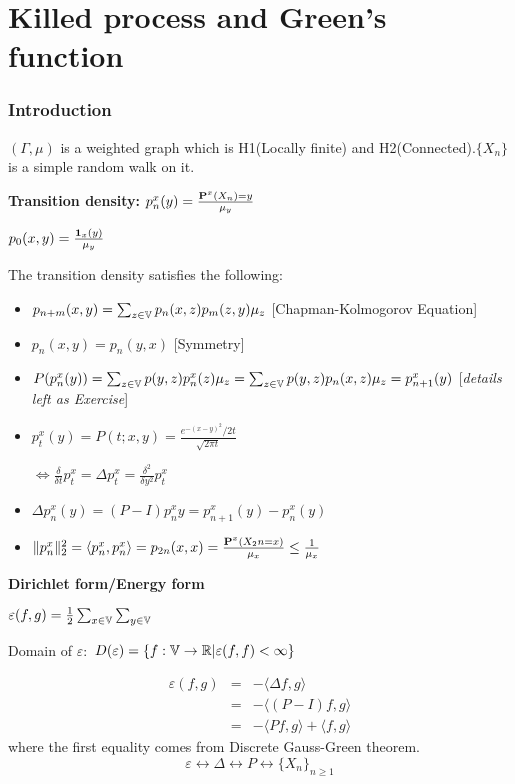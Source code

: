 \documentclass[main]{subfiles}
\begin{document}
\part{Killed process and Green's function}
\section{Introduction}

$(\Gamma, \mu)$ is a weighted graph which is H1(Locally finite) and H2(Connected).$\{X_n\}$ is a simple random walk on it.

\textbf{Transition density:} $p_n^x(y)=\frac{\P^x(X_n)=y}{\mu_y}$

$p_0(x,y)=\frac{\1_x(y)}{\mu_y}$

The transition density satisfies the following:
\begin{itemize}
     \item $p_{n+m}(x,y)=\sum_{z \in \V}p_n(x,z)p_m(z,y)\mu_z$  \hspace{1cm} [Chapman-Kolmogorov Equation]
     \item
           $p_n(x,y)=p_n(y,x)$ \hspace{4cm} [Symmetry]
     \item
           $P(p_n^x(y))=\sum_{z \in \V}p(y,z)p_n^x(z)\mu_z=\sum_{z \in \V}p(y,z)p_n(x,z)\mu_z=p_{n+1}^x(y)$  [\textit{details left as Exercise}]
     \item
           $p_t^x(y)=P(t;x,y)=\frac{e^{-(x-y)^2}/2t}{\sqrt{2\pi t}}$

           $\Leftrightarrow \frac{\delta}{\delta t}p_t^x=\Delta p_t^x=\frac{\delta^2}{\delta y^2}p_t^x$
     \item
           $\Delta p_n^x(y)= (P-I)p_n^xy=p_{n+1}^x(y)-p_n^x(y)$
     \item
           $\Vert p_n^x\Vert_2^2=\langle p_n^x, p_n^x \rangle=p_{2n}(x,x)=\frac{\P^x(X_2n=x)}{\mu_x} \leq \frac{1}{\mu_x}$
\end{itemize}

\textbf{Dirichlet form/Energy form}

$\varepsilon(f,g)=\frac{1}{2} \sum_{x \in \V}\sum_{y \in \V}$

Domain of $\varepsilon:$  $D(\varepsilon)= \{f:\V \rightarrow \mathbb{R}| \varepsilon(f,f) < \infty\}$

\begin{eqnarray*}
     \varepsilon(f,g)&=&-\langle \Delta f, g \rangle  \\
     &=& -\langle (P-I)f, g \rangle \\
     &=& -\langle Pf, g \rangle + \langle f, g \rangle
\end{eqnarray*}
where the first equality comes from Discrete Gauss-Green theorem.
$$\varepsilon \leftrightarrow \Delta \leftrightarrow P \leftrightarrow \{X_n\}_{n \geq 1}$$
\end{document}
